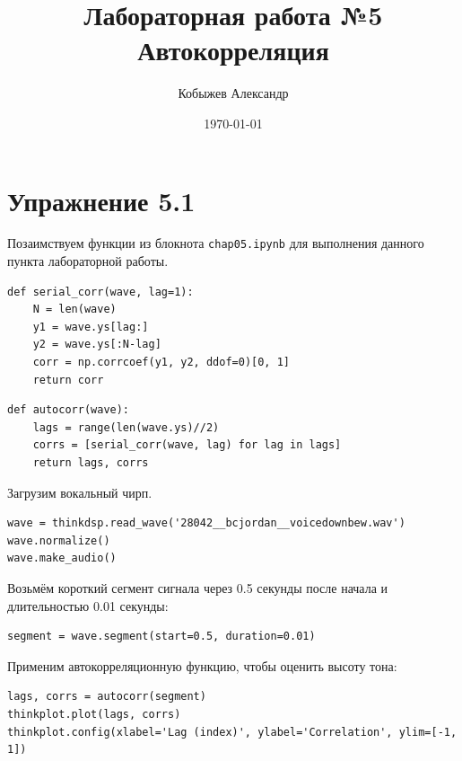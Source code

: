 \documentclass[a4paper,12pt]{report}
\title{Лабораторная работа №5\\Автокорреляция}
\author{Кобыжев Александр}
\date{\today}
\begin{document}
\maketitle
\tableofcontents
\listoffigures
\lstlistoflistings

\maketitle

\chapter{Упражнение 5.1}

Позаимствуем функции из блокнота \texttt{chap05.ipynb} для выполнения данного пункта лабораторной работы.

\begin{lstlisting}[caption=Функция serial\_corr]
def serial_corr(wave, lag=1):
    N = len(wave)
    y1 = wave.ys[lag:]
    y2 = wave.ys[:N-lag]
    corr = np.corrcoef(y1, y2, ddof=0)[0, 1]
    return corr
\end{lstlisting}

\begin{lstlisting}[caption=Функция \texttt{autocorr}]
def autocorr(wave):
    lags = range(len(wave.ys)//2)
    corrs = [serial_corr(wave, lag) for lag in lags]
    return lags, corrs
\end{lstlisting}

Загрузим вокальный чирп.

\begin{lstlisting}[caption=Вокальный чирп]
wave = thinkdsp.read_wave('28042__bcjordan__voicedownbew.wav')
wave.normalize()
wave.make_audio()
\end{lstlisting}

Возьмём короткий сегмент сигнала через 0.5 секунды после начала и длительностью 0.01 секунды:

\begin{lstlisting}[caption=Первый сегмент]
segment = wave.segment(start=0.5, duration=0.01)
\end{lstlisting}

Применим автокорреляционную функцию, чтобы оценить высоту тона:

\begin{lstlisting}[caption=Оценка высоты тона]
lags, corrs = autocorr(segment)
thinkplot.plot(lags, corrs)
thinkplot.config(xlabel='Lag (index)', ylabel='Correlation', ylim=[-1, 1])
\end{lstlisting}
\end{document}
